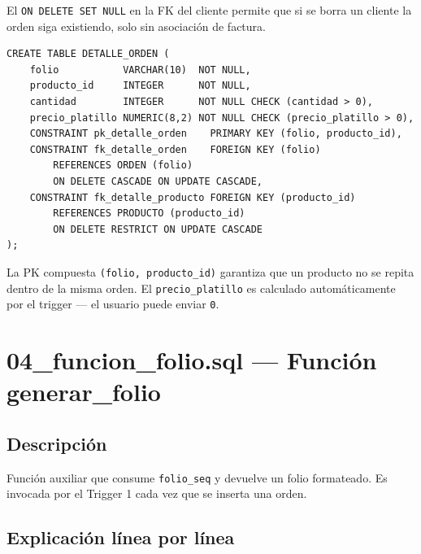 \documentclass[12pt, a4paper]{article}
\begin{document}
El \texttt{ON DELETE SET NULL} en la FK del cliente permite que si se borra un cliente la orden siga existiendo, solo sin asociaci\'on de factura.

\begin{lstlisting}[caption={DETALLE\_ORDEN --- renglones de la orden}]
CREATE TABLE DETALLE_ORDEN (
    folio           VARCHAR(10)  NOT NULL,
    producto_id     INTEGER      NOT NULL,
    cantidad        INTEGER      NOT NULL CHECK (cantidad > 0),
    precio_platillo NUMERIC(8,2) NOT NULL CHECK (precio_platillo > 0),
    CONSTRAINT pk_detalle_orden    PRIMARY KEY (folio, producto_id),
    CONSTRAINT fk_detalle_orden    FOREIGN KEY (folio)
        REFERENCES ORDEN (folio)
        ON DELETE CASCADE ON UPDATE CASCADE,
    CONSTRAINT fk_detalle_producto FOREIGN KEY (producto_id)
        REFERENCES PRODUCTO (producto_id)
        ON DELETE RESTRICT ON UPDATE CASCADE
);
\end{lstlisting}

La PK compuesta \texttt{(folio, producto\_id)} garantiza que un producto no se repita dentro de la misma orden. El \texttt{precio\_platillo} es calculado autom\'aticamente por el trigger --- el usuario puede enviar \texttt{0}.

\section{04\_funcion\_folio.sql --- Funci\'on generar\_folio}

\subsection{Descripci\'on}

Funci\'on auxiliar que consume \texttt{folio\_seq} y devuelve un folio formateado. Es invocada por el Trigger 1 cada vez que se inserta una orden.

\subsection{Explicaci\'on l\'inea por l\'inea}
\end{document}
